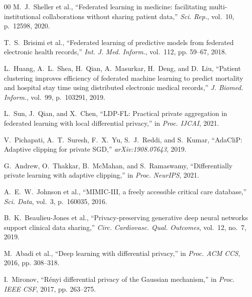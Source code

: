 \documentclass[journal]{IEEEtran}
\begin{document}
\begin{thebibliography}{00}
M.~J.~Sheller et al.,
``Federated learning in medicine: facilitating multi-institutional
collaborations without sharing patient data,''
\textit{Sci. Rep.}, vol.~10, p.~12598, 2020.

T.~S.~Brisimi et al.,
``Federated learning of predictive models from federated electronic health
records,''
\textit{Int. J. Med. Inform.}, vol.~112, pp. 59--67, 2018.

L.~Huang, A.~L.~Shea, H.~Qian, A.~Masurkar, H.~Deng, and D.~Liu,
``Patient clustering improves efficiency of federated machine learning to
predict mortality and hospital stay time using distributed electronic medical
records,''
\textit{J. Biomed. Inform.}, vol.~99, p.~103291, 2019.

L.~Sun, J.~Qian, and X.~Chen,
``LDP-FL: Practical private aggregation in federated learning with local
differential privacy,''
in \textit{Proc. IJCAI}, 2021.

V.~Pichapati, A.~T.~Suresh, F.~X.~Yu, S.~J.~Reddi, and S.~Kumar,
``AdaCliP: Adaptive clipping for private SGD,''
\textit{arXiv:1908.07643}, 2019.

G.~Andrew, O.~Thakkar, B.~McMahan, and S.~Ramaswamy,
``Differentially private learning with adaptive clipping,''
in \textit{Proc. NeurIPS}, 2021.

A.~E.~W.~Johnson et al.,
``MIMIC-III, a freely accessible critical care database,''
\textit{Sci. Data}, vol.~3, p.~160035, 2016.

B.~K.~Beaulieu-Jones et al.,
``Privacy-preserving generative deep neural networks support clinical data
sharing,''
\textit{Circ. Cardiovasc. Qual. Outcomes}, vol.~12, no.~7, 2019.

M.~Abadi et al.,
``Deep learning with differential privacy,''
in \textit{Proc. ACM CCS}, 2016, pp. 308--318.

I.~Mironov,
``R\'{e}nyi differential privacy of the Gaussian mechanism,''
in \textit{Proc. IEEE CSF}, 2017, pp. 263--275.

\end{thebibliography}
\end{document}
